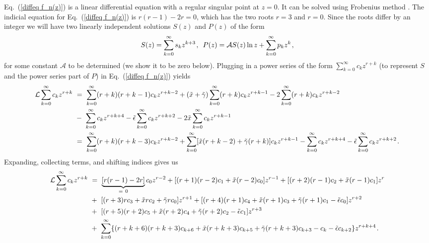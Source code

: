 \documentclass[fleqn,usenatbib]{mnras}
\begin{document}
Eq.~(\ref{diffeq f_n(z)}) is a linear differential equation with a regular singular point at $z = 0$. It can be solved using Frobenius method \citep[e.g.][]{Arfken2013}. The indicial equation for Eq.~(\ref{diffeq f_n(z)}) is $r(r-1) -2r = 0$, which has the two roots $r = 3$ and $r = 0$. Since the roots differ by an integer we will have two linearly independent solutions $S(z)$ and $P(z)$ of the form
\begin{equation}
    S(z) = \sum_{k=0}^{\infty} s_k z^{k+3} \hspace{1 pt} , \hspace{5 pt} P(z) = \mathcal{A} S(z) \ln z + \sum_{k=0}^{\infty} p_k z^{k} \hspace{1 pt} ,
\end{equation}
for some constant $\mathcal{A}$ to be determined (we show it to be zero below). Plugging in a power series of the form $\sum_{k=0}^{\infty} c_k z^{r+k}$ (to represent $S$ and the power series part of $P$) in Eq.~(\ref{diffeq f_n(z)}) yields 
\begin{align}
    \mathcal{L} \sum_{k=0}^{\infty} c_k z^{r+k} ~&=~ \sum_{k = 0}^{\infty} (r+k)(r+k-1) c_k z^{r+k-2} + (\Tilde{x} +\Tilde{\gamma})\sum_{k = 0}^{\infty} (r+k) c_k z^{r+k-1} - 2 \sum_{k = 0}^{\infty} (r+k) c_k z^{r+k-2} \nonumber \\ ~&-~ \sum_{k = 0}^{\infty} c_k z^{r+k+4} - \Tilde{\epsilon} \sum_{k = 0}^{\infty} c_k z^{r+k+2} - 2 \Tilde{x} \sum_{k = 0}^{\infty} c_k z^{r+k-1} \nonumber \\ ~&=~ \sum_{k = 0}^{\infty} (r+k)(r+k-3)c_k z^{r+k-2} + \sum_{k = 0}^{\infty}[\Tilde{x}(r+k-2) + \Tilde{\gamma}(r+k)] c_k z^{r+k-1} - \sum_{k = 0}^{\infty} c_k z^{r+k+4} - \Tilde{\epsilon} \sum_{k = 0}^{\infty} c_k z^{r+k+2}  \hspace{1 pt} .
\end{align}
Expanding, collecting terms, and shifting indices gives us
\begin{align}
    \mathcal{L} \sum_{k=0}^{\infty} c_k z^{r+k} ~&=~ \underbrace{[r(r-1) - 2r]}_{=~0}c_{0} z^{r-2} + [(r+1)(r-2) c_1 + \Tilde{x}(r-2) c_0] z^{r-1} + [(r+2)(r-1)c_2 + \Tilde{x}(r-1)c_1 ] z^r \nonumber \\ ~&+~  [(r+3)r c_3 + \Tilde{x}r c_2 + \Tilde{\gamma} r c_0] z^{r+1} + [(r+4)(r+1)c_4 + \Tilde{x}(r+1)c_3 + \Tilde{\gamma}(r+1) c_1 - \Tilde{\epsilon} c_0 ]z^{r+2} \nonumber \\ ~&+~ [(r+5)(r+2) c_5 + \Tilde{x}(r+2)c_4 + \Tilde{\gamma}(r+2) c_2 - \Tilde{\epsilon} c_1 ]z^{r+3}
    \nonumber \\ ~&+~ \sum_{k = 0}^{\infty} \{ (r+k+6)(r+k+3)c_{k+6} + \Tilde{x}(r+k+3)  c_{k+5} + \Tilde{\gamma}(r+k+3) c_{k+3} - c_k - \Tilde{\epsilon} c_{k+2} \}z^{r+k+4} \hspace{1 pt} . \label{L of c_k z^r+k}
\end{align}
\end{document}
